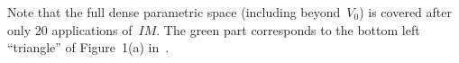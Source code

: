 \documentclass{llncs}
\newcommand{\IM}{\mathit{IM}}
\newcommand{\commentaire}[1]{\textcolor{red}{\textbf{$\Leftarrow$  #1 $\Rightarrow$}}}
\begin{document}
Note that the full dense parametric space (including beyond~$V_0$) is covered after only 20 applications of~$\IM$.
The green part corresponds to the bottom left ``triangle'' of Figure~1(a) in~\cite{bb04}.


% 
% 
% 
\end{document}
